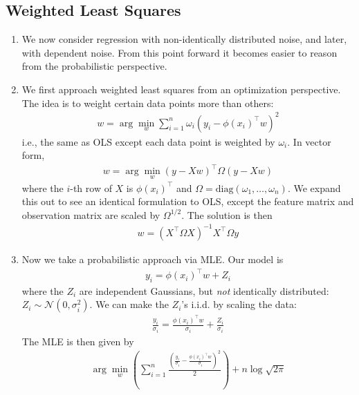 \documentclass[10pt]{article}
\begin{document}
\begin{multicols}{2}
\begin{addmargin}[0.8em]{0.5em}
    \subsection{Weighted Least Squares}
    \begin{enumerate}[label=(\alph*)]
        \item We now consider regression with non-identically distributed noise, and later, with dependent noise. From this point forward it becomes easier to reason from the probabilistic perspective.
        \item We first approach weighted least squares from an optimization perspective. The idea is to weight certain data points more than others:
        \begin{align*}
        w = \arg\min_{w} \sum_{i=1}^{n} \omega_i (y_i - \phi(x_i)^\top w)^2
        \end{align*}
        i.e., the same as OLS except each data point is weighted by $\omega_i$. In vector form,
        \begin{align*}
        w = \arg\min_{w} (y - Xw)^\top \Omega (y - Xw)
        \end{align*}
        where the $i$-th row of $X$ is $\phi(x_i)^\top$ and $\Omega = \text{diag}(\omega_1, \hdots, \omega_n)$. We expand this out to see an identical formulation to OLS, except the feature matrix and observation matrix are scaled by $\Omega^{1/2}$. The solution is then
        \begin{align*}
        w = (X^\top \Omega X)^{-1} X^\top \Omega y
        \end{align*}
        \item Now we take a probabilistic approach via MLE. Our model is
        \begin{align*}
        y_i = \phi(x_i)^\top w + Z_i
        \end{align*}
        where the $Z_i$ are independent Gaussians, but \textit{not} identically distributed: $Z_i \sim \mathcal{N}(0, \sigma_i^2)$. We can make the $Z_i$'s i.i.d. by scaling the data:
        \begin{align*}
        \frac{y_i}{\sigma_i} = \frac{\phi(x_i)^\top w}{\sigma_i} + \frac{Z_i}{\sigma_i}
        \end{align*}
        The MLE is then given by
        \begin{align*}
        \arg\min_{w} \left( \sum_{i=1}^{n} \frac{(\frac{y_i}{\sigma_i} - \frac{\phi(x_i)^\top w}{\sigma_i})^2}{2} \right) + n\log{\sqrt{2\pi}}
        \end{align*}

\end{enumerate}
\end{addmargin}
\end{multicols}
\end{document}
